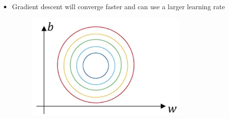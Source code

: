 \documentclass[12pt, letterpaper]{article}
\begin{document}
\begin{itemize}
        \begin{itemize}
            \item Gradient descent will converge faster and can use a larger learning rate
            \begin{figure}[ht]
                \centering
                \includegraphics[width=8cm]{19.png}
            \end{figure}
        \end{itemize}
    \end{itemize}
\end{document}
